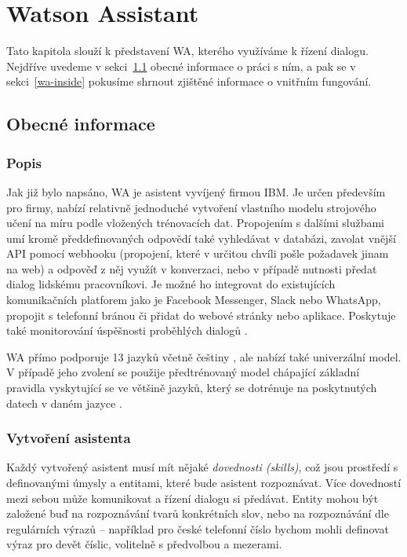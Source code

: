 \chapter{Watson Assistant}\label{chapter-wa}

Tato kapitola slouží k představení WA,
kterého využíváme k řízení dialogu.
Nejdříve uvedeme v sekci~\ref{wa-common} obecné informace
o práci s ním, a pak se v sekci~\ref{wa-inside} pokusíme shrnout zjištěné
informace o vnitřním fungování.

\section{Obecné informace}\label{wa-common}

\subsection{Popis}

Jak již bylo napsáno, WA je asistent vyvíjený firmou IBM.
Je určen především pro firmy, nabízí relativně jednoduché vytvoření
vlastního modelu strojového učení na míru podle vložených trénovacích
dat. Propojením s dalšími službami umí kromě předdefinovaných odpovědí
také vyhledávat v databázi, zavolat vnější API pomocí webhooku (propojení,
které v určitou chvíli pošle požadavek jinam na web) a odpověď
z něj využít v konverzaci, nebo v případě nutnosti předat dialog lidskému
pracovníkovi. Je možné ho integrovat do existujících komunikačních platforem
jako je Facebook Messenger, Slack nebo WhatsApp, propojit s telefonní
bránou či přidat do webové stránky nebo aplikace. Poskytuje také monitorování
úspěšnosti proběhlých dialogů \citep{wa_about}.

WA přímo podporuje 13 jazyků včetně
češtiny \citep{wa_languages}, ale nabízí také univerzální model. V případě
jeho zvolení se použije předtrénovaný model chápající základní pravidla
vyskytující se ve většině jazyků, který se dotrénuje na poskytnutých
datech v daném jazyce \citep{wa_universal_model}.

\subsection{Vytvoření asistenta}\label{wa-create}

Každý vytvořený asistent musí mít nějaké \textit{dovednosti (skills)},
což jsou prostředí s definovanými úmysly a entitami, které bude asistent
rozpoznávat. Více dovedností mezi sebou může komunikovat
a řízení dialogu si předávat. Entity mohou být založené buď na rozpoznávání tvarů
konkrétních slov, nebo na rozpoznávání dle regulárních výrazů -- například
pro české telefonní
číslo bychom mohli definovat výraz pro devět číslic, volitelně s
předvolbou a mezerami.

